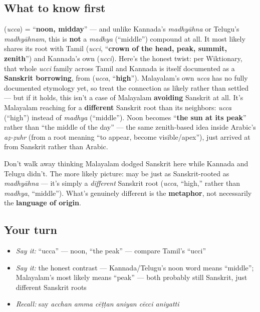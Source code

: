\subsection*{What to know first}
\textbf{} (\emph{ucca}) = \textquotedblleft{}\textbf{noon, midday}\textquotedblright{} — and unlike Kannada's \emph{madhyāhna} or Telugu's \emph{madhyāhnam}, this is \textbf{not} a \emph{madhya} (\textquotedblleft{}middle\textquotedblright{}) compound at all. It most likely shares its root with Tamil \textbf{} (\emph{ucci}, \textquotedblleft{}\textbf{crown of the head, peak, summit, zenith}\textquotedblright{}) and Kannada's own \textbf{} (\emph{ucci}). Here's the honest twist: per Wiktionary, that whole \emph{ucci} family across Tamil and Kannada is itself documented as a \textbf{Sanskrit borrowing}, from \textbf{} (\emph{ucca}, \textquotedblleft{}\textbf{high}\textquotedblright{}). Malayalam's own \emph{ucca} has no fully documented etymology yet, so treat the connection as likely rather than settled — but if it holds, this isn't a case of Malayalam \textbf{avoiding} Sanskrit at all. It's Malayalam reaching for a \textbf{different} Sanskrit root than its neighbors: \emph{ucca} (\textquotedblleft{}high\textquotedblright{}) instead of \emph{madhya} (\textquotedblleft{}middle\textquotedblright{}). Noon becomes \textquotedblleft{}\textbf{the sun at its peak}\textquotedblright{} rather than \textquotedblleft{}the middle of the day\textquotedblright{} — the same zenith-based idea inside Arabic's \emph{aẓ-ẓuhr} (from a root meaning \textquotedblleft{}to appear, become visible/apex\textquotedblright{}), just arrived at from Sanskrit rather than Arabic.

\begin{culture}
Don't walk away thinking Malayalam dodged Sanskrit here while Kannada and Telugu didn't. The more likely picture: \textbf{} may be just as Sanskrit-rooted as \emph{madhyāhna} — it's simply a \emph{different} Sanskrit root (\emph{ucca}, \textquotedblleft{}high,\textquotedblright{} rather than \emph{madhya}, \textquotedblleft{}middle\textquotedblright{}). What's genuinely different is the \textbf{metaphor}, not necessarily the \textbf{language of origin}.
\end{culture}

\subsection*{Your turn}
\begin{itemize}
\raggedright
  \item \emph{Say it:} \textquotedblleft{}ucca\textquotedblright{} — noon, \textquotedblleft{}the peak\textquotedblright{} — compare Tamil's \textquotedblleft{}ucci\textquotedblright{}
  \item \emph{Say it:} the honest contrast — Kannada/Telugu's noon word means \textquotedblleft{}middle\textquotedblright{}; Malayalam's most likely means \textquotedblleft{}peak\textquotedblright{} — both probably still Sanskrit, just different Sanskrit roots
  \item \emph{Recall:} say \emph{acchan amma cēṭṭan aniyan cēcci aniyatti}
\end{itemize}


